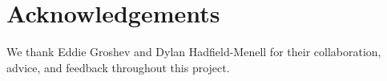 \section{Acknowledgements}
We thank Eddie Groshev and Dylan Hadfield-Menell for their collaboration, advice, and feedback
throughout this project.